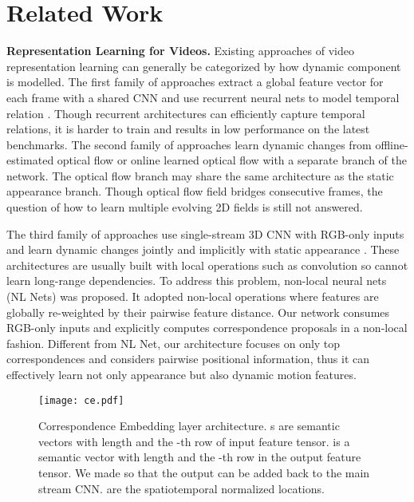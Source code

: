\documentclass[10pt,twocolumn,letterpaper]{article}
\begin{document}
\section{Related Work}

\textbf{Representation Learning for Videos.} 
Existing approaches of video representation learning can generally be categorized by how dynamic component is modelled. The first family of approaches extract a global feature vector for each frame with a shared CNN and use recurrent neural nets to model temporal relation \cite{Long-Term:RCNN,Beyond:Short:Snippets}. Though recurrent architectures can efficiently capture temporal relations, 
it is harder to train and results in low performance on the latest benchmarks.
The second family of approaches learn dynamic changes from offline-estimated optical flow \cite{Two-stream:CNN,Two-stream:Fusion} or online learned optical flow \cite{TVLNet} with a separate branch of the network. The optical flow branch may share the same architecture as the static appearance branch. Though optical flow field bridges consecutive frames, the question of how to learn multiple evolving 2D fields is still not answered.

The third family of approaches use single-stream 3D CNN with RGB-only inputs and learn dynamic changes jointly and implicitly with static appearance \cite{C3D,I3D,Tran:ConvNet:search,Karpathy:Video:CNN,ARTNet,ECO}. These architectures are usually built with local operations such as convolution so cannot learn long-range dependencies. To address this problem, non-local neural nets (NL Nets) \cite{NLNet} was proposed. It adopted non-local operations where features are globally re-weighted by their pairwise feature distance. 
Our network consumes RGB-only inputs and explicitly computes correspondence proposals in a non-local fashion. Different from NL Net, our architecture focuses on only top correspondences and considers pairwise positional information, thus it can effectively learn not only appearance but also dynamic motion features.







\begin{figure*}[t]
\centering
\texttt{[image: ce.pdf]}
\caption{Correspondence Embedding layer architecture.  s are semantic vectors with length  and the -th row of input    feature tensor.  is a semantic vector with length  and the -th row in the output    feature tensor. We made  so that the output can be added back to the main stream CNN.   are the spatiotemporal normalized locations.}
\label{fig:ce}
\vspace{-2ex}
\end{figure*}
\end{document}
